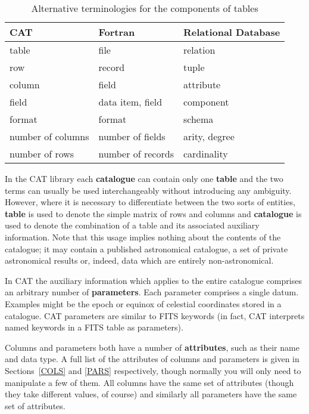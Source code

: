 \begin{table}[htbp]

\begin{center}
\begin{tabular}{lll}
CAT               &  Fortran           &  Relational Database \\ \hline
table             &  file              &  relation      \\
row               &  record            &  tuple         \\
column            &  field             &  attribute     \\
field             &  data item, field  &  component     \\
format            &  format            &  schema        \\
number of columns &  number of fields  &  arity, degree \\
number of rows    &  number of records &  cardinality   \\
\end{tabular}
\end{center}

\caption{\label{TABLE_NOT}Alternative terminologies for the components of
tables}

\end{table}

In the CAT library each {\bf catalogue} can contain only one {\bf
table} and the two terms can usually be used interchangeably without
introducing any ambiguity. However, where it is necessary to
differentiate between the two sorts of entities, {\bf table} is used
to denote the simple matrix of rows and columns and {\bf catalogue} is
used to denote the combination of a table and its associated auxiliary
information. Note that this usage implies nothing about the contents
of the catalogue; it may contain a published astronomical catalogue, a
set of private astronomical results or, indeed, data which are entirely
non-astronomical.

In CAT the auxiliary information which applies to the entire catalogue
comprises an arbitrary number of {\bf parameters}. Each parameter
comprises a single datum. Examples might be the epoch or equinox of
celestial coordinates stored in a catalogue. CAT parameters are
similar to FITS keywords (in fact, CAT interprets named keywords in
a FITS table as parameters).

Columns and parameters both have a number of {\bf attributes}, such
as their name and data type. A full list of the attributes of
columns and parameters is given in Sections~\ref{COLS} and
\ref{PARS} respectively, though normally you will only need to
manipulate a few of them.  All columns have the same set of attributes
(though they take different values, of course) and similarly all
parameters have the same set of attributes.

